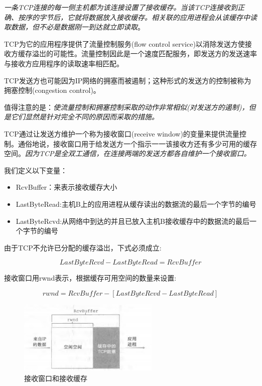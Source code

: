     \emph{一条TCP连接的每一侧主机都为该连接设置了接收缓存。当该TCP连接收到正确、按序的字节后，它就将数据放入接收缓存。相关联的应用进程会从该缓存中读取数据，但不必是数据刚一到达就立即读取}。

    TCP为它的应用程序提供了流量控制服务(flow control service)以消除发送方使接收方缓存溢岀的可能性。流量控制因此是一个速度匹配服务，即发送方的发送速率与接收方应用程序的读取速率相匹配。

    TCP发送方也可能因为IP网络的拥塞而被遏制；这种形式的发送方的控制被称为拥塞控制(congestion control)。

    值得注意的是：\emph{使流量控制和拥塞控制采取的动作非常相似(对发送方的遏制)，但是它们显然是针对完全不同的原因而采取的措施。}

    TCP通过让发送方维护一个称为接收窗口(receive window)的变量来提供流量控制。通俗地说，接收窗口用于给发送方一个指示一一该接收方还有多少可用的缓存空间。\emph{因为TCP是全双工通信，在连接两端的发送方都各自维护一个接收窗口。}

    我们定义以下变量：

\begin{itemize}
    \item RcvBuffer：来表示接收缓存大小
    \item LastByteRead:主机B上的应用进程从缓存读出的数据流的最后一个字节的编号
    \item LastByteRcvd:从网络中到达的并且已放入主机B接收缓存中的数据流的最后一个字节的编号
\end{itemize}

    由于TCP不允许已分配的缓存溢岀，下式必须成立:

$$
    LastByteRcvd - LastByteRead = RcvBuffer
$$

    接收窗口用rwnd表示，根据缓存可用空间的数量来设置:

$$
    rwnd = RcvBuffer - [LastByteRcvd - LastByteRead]
$$

\begin{figure}[!htbp]
    \centering
    \includegraphics[width=0.6\textwidth]{image/chapter03/接收窗口和接收缓存.png}
    \caption{接收窗口和接收缓存}
\end{figure}

